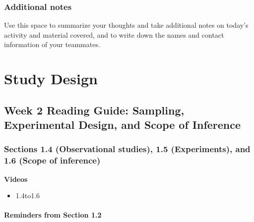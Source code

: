 \documentclass[
]{report}
\providecommand{\tightlist}{%
  \setlength{\itemsep}{0pt}\setlength{\parskip}{0pt}}
\begin{document}
\hypertarget{additional-notes}{%
\subsection{Additional notes}\label{additional-notes}}

Use this space to summarize your thoughts and take additional notes on today's activity and material covered, and to write down the names and contact information of your teammates.

\newpage

\hypertarget{study-design}{%
\chapter{Study Design}\label{study-design}}

\hypertarget{week-2-reading-guide-sampling-experimental-design-and-scope-of-inference}{%
\section{Week 2 Reading Guide: Sampling, Experimental Design, and Scope of Inference}\label{week-2-reading-guide-sampling-experimental-design-and-scope-of-inference}}

\hypertarget{sections-1.4-observational-studies-1.5-experiments-and-1.6-scope-of-inference}{%
\subsection*{Sections 1.4 (Observational studies), 1.5 (Experiments), and 1.6 (Scope of inference)}\label{sections-1.4-observational-studies-1.5-experiments-and-1.6-scope-of-inference}}


\textbf{Videos}

\begin{itemize}
\tightlist
\item
  1.4to1.6
\end{itemize}


\hypertarget{reminders-from-section-1.2}{%
\subsubsection*{Reminders from Section 1.2}\label{reminders-from-section-1.2}}
\end{document}
